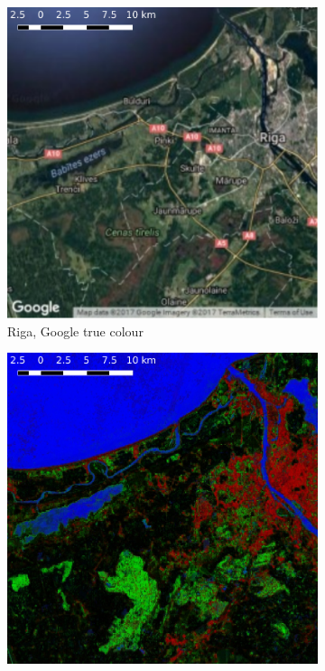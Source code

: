 \documentclass[a4paper,12pt]{scrbook}
\begin{document}
\begin{figure}
  \ContinuedFloat
  \centering
  \begin{subfigure}[t]{.24\textwidth}
    \includegraphics[width=\textwidth]{thesis-figures/figures-qgis/riga-google}
    \caption{Riga, Google true colour}
  \end{subfigure} \hfill
  \begin{subfigure}[t]{.24\textwidth}
    \includegraphics[width=\textwidth]{thesis-figures/figures-qgis/riga-rf}

\end{subfigure}
\end{figure}
\end{document}

